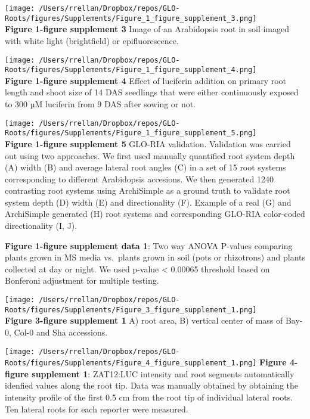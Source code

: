 \documentclass[]{article}
\begin{document}
\pagebreak

\texttt{[image: /Users/rrellan/Dropbox/repos/GLO-Roots/figures/Supplements/Figure\_1\_figure\_supplement\_3.png]}\\\textbf{Figure
1-figure supplement 3} Image of an Arabidopsis root in soil imaged with
white light (brightfield) or epifluorescence.

\pagebreak

\texttt{[image: /Users/rrellan/Dropbox/repos/GLO-Roots/figures/Supplements/Figure\_1\_figure\_supplement\_4.png]}\\\textbf{Figure
1-figure supplement 4} Effect of luciferin addition on primary root
length and shoot size of 14 DAS seedlings that were either continuously
exposed to 300 µM luciferin from 9 DAS after sowing or not.

\pagebreak

\texttt{[image: /Users/rrellan/Dropbox/repos/GLO-Roots/figures/Supplements/Figure\_1\_figure\_supplement\_5.png]}\\\textbf{Figure
1-figure supplement 5} GLO-RIA validation. Validation was carried out
using two approaches. We first used manually quantified root system
depth (A) width (B) and average lateral root angles (C) in a set of 15
root systems corresponding to different Arabidopsis accesions. We then
generated 1240 contrasting root systems using ArchiSimple as a ground
truth to validate root system depth (D) width (E) and directionality
(F). Example of a real (G) and ArchiSimple generated (H) root systems
and corresponding GLO-RIA color-coded directionality (I, J).

\pagebreak

\textbf{Figure 1-figure supplement data 1}: Two way ANOVA P-values
comparing plants grown in MS media vs.~plants grown in soil (pots or
rhizotrons) and plants collected at day or night. We used p-value
\textless{} 0.00065 threshold based on Bonferoni adjustment for multiple
testing.

\pagebreak

\texttt{[image: /Users/rrellan/Dropbox/repos/GLO-Roots/figures/Supplements/Figure\_3\_figure\_supplement\_1.png]}\\\textbf{Figure
3-figure supplement 1} A) root area, B) vertical center of mass of
Bay-0, Col-0 and Sha accessions.

\pagebreak

\texttt{[image: /Users/rrellan/Dropbox/repos/GLO-Roots/figures/Supplements/Figure\_4\_figure\_supplement\_1.png]}
\textbf{Figure 4-figure supplement 1}: ZAT12:LUC intensity and root
segments automatically idenfied values along the root tip. Data was
manually obtained by obtaining the intensity profile of the first 0.5 cm
from the root tip of individual lateral roots. Ten lateral roots for
each reporter were measured.\\\pagebreak
\end{document}
